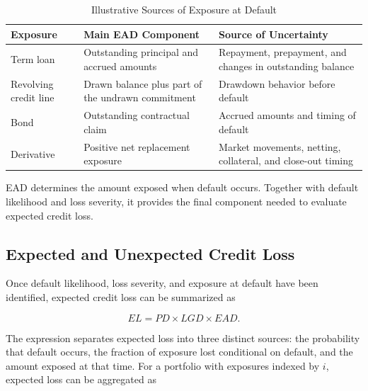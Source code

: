 \begin{table}[H]

\centering

\caption{Illustrative Sources of Exposure at Default}

\label{tab:ch19-ead-exposures}

\begin{tabularx}{\textwidth}{@{}p{3.5cm}YY@{}}

\toprule

\textbf{Exposure} &
\textbf{Main EAD Component} &
\textbf{Source of Uncertainty} \\

\midrule

Term loan &
Outstanding principal and accrued amounts &
Repayment, prepayment, and changes in outstanding balance \\

Revolving credit line &
Drawn balance plus part of the undrawn commitment &
Drawdown behavior before default \\

Bond &
Outstanding contractual claim &
Accrued amounts and timing of default \\

Derivative &
Positive net replacement exposure &
Market movements, netting, collateral, and close-out timing \\

\bottomrule

\end{tabularx}

\end{table}


EAD determines the amount exposed when default occurs. Together with default likelihood and loss severity, it provides the final component needed to evaluate expected credit loss.

\subsection{Expected and Unexpected Credit Loss}

Once default likelihood, loss severity, and exposure at default have been identified, expected credit loss can be summarized as

\begin{equation}
EL=PD\times LGD\times EAD.
\label{eq:ch19-expected-loss}
\end{equation}

The expression separates expected loss into three distinct sources: the probability that default occurs, the fraction of exposure lost conditional on default, and the amount exposed at that time. For a portfolio with exposures indexed by \(i\), expected loss can be aggregated as

